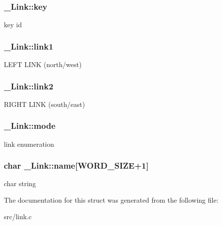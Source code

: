 \subsubsection[{\texorpdfstring{key}{key}}]{ \+\_\+\+Link\+::key}\hypertarget{struct__Link_a51a17371bac3cb3d09e011a95da238b6}{}\label{struct__Link_a51a17371bac3cb3d09e011a95da238b6}
key id 
\subsubsection[{\texorpdfstring{link1}{link1}}]{ \+\_\+\+Link\+::link1}\hypertarget{struct__Link_a5e7fbb3e1b15bf0cf981153c08be0729}{}\label{struct__Link_a5e7fbb3e1b15bf0cf981153c08be0729}
L\+E\+FT L\+I\+NK (north/west) 
\subsubsection[{\texorpdfstring{link2}{link2}}]{ \+\_\+\+Link\+::link2}\hypertarget{struct__Link_a7ea0ebc1c732428f2cc7e66b6b8832e4}{}\label{struct__Link_a7ea0ebc1c732428f2cc7e66b6b8832e4}
R\+I\+G\+HT L\+I\+NK (south/east) 
\subsubsection[{\texorpdfstring{mode}{mode}}]{ \+\_\+\+Link\+::mode}\hypertarget{struct__Link_a48f4cacf668ee2063e79d927bf50578a}{}\label{struct__Link_a48f4cacf668ee2063e79d927bf50578a}
link enumeration 
\subsubsection[{\texorpdfstring{name}{name}}]{\setlength{\rightskip}{0pt plus 5cm}char \+\_\+\+Link\+::name\mbox{[}{\bf W\+O\+R\+D\+\_\+\+S\+I\+ZE}+1\mbox{]}}\hypertarget{struct__Link_a020ee863120055b29609157b9de3c84d}{}\label{struct__Link_a020ee863120055b29609157b9de3c84d}
char string 

The documentation for this struct was generated from the following file\+:\begin{DoxyCompactItemize}
\item 
src/link.\+c\end{DoxyCompactItemize}
